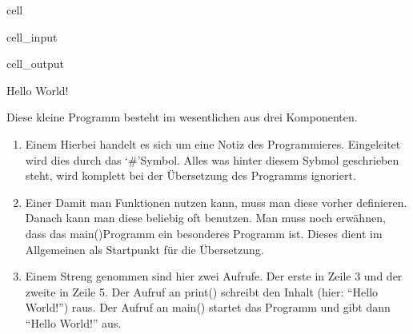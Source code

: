 \documentclass[letterpaper,10pt,english]{jupyterBook}
\begin{document}
\begin{sphinxuseclass}{cell}\begin{sphinxVerbatimInput}

\begin{sphinxuseclass}{cell_input}
\begin{sphinxVerbatim}[commandchars=\\\{\}]
 
    
\end{sphinxVerbatim}

\end{sphinxuseclass}\end{sphinxVerbatimInput}
\begin{sphinxVerbatimOutput}

\begin{sphinxuseclass}{cell_output}
\begin{sphinxVerbatim}[commandchars=\\\{\}]
Hello World!
\end{sphinxVerbatim}

\end{sphinxuseclass}\end{sphinxVerbatimOutput}

\end{sphinxuseclass}
\sphinxAtStartPar
Diese kleine Programm besteht im wesentlichen aus drei Komponenten.
\begin{enumerate}
%
\item {} 
\sphinxAtStartPar
Einem  Hierbei handelt es sich um eine Notiz des Programmieres. Eingeleitet wird dies durch das ‘\#’\sphinxhyphen{}Symbol. Alles was hinter diesem Sybmol geschrieben steht, wird komplett bei der Übersetzung des Programms ignoriert.

\item {} 
\sphinxAtStartPar
Einer  Damit man Funktionen nutzen kann, muss man diese vorher definieren. Danach kann man diese beliebig oft benutzen. Man muss noch erwähnen, dass das main()\sphinxhyphen{}Programm ein besonderes Programm ist. Dieses dient im Allgemeinen als Startpunkt für die Übersetzung.

\item {} 
\sphinxAtStartPar
Einem  Streng genommen sind hier zwei Aufrufe. Der erste in Zeile 3 und der zweite in Zeile 5. Der Aufruf an print() schreibt den Inhalt (hier: “Hello World!”) raus. Der Aufruf an main() startet das Programm und gibt dann “Hello World!” aus.

\end{enumerate}
\end{document}
